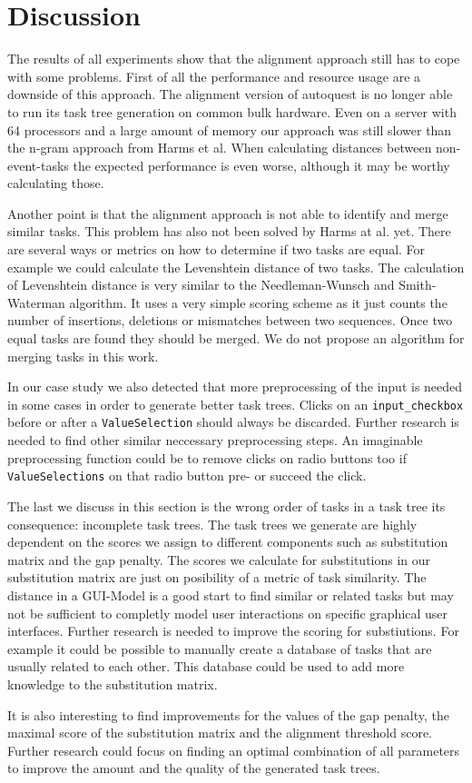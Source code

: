 \section{Discussion}
The results of all experiments show that the alignment approach still has to cope with some problems.
First of all the performance and resource usage are a downside of this approach. 
The alignment version of autoquest is no longer able to run its task tree generation on common bulk hardware. 
Even on a server with 64 processors and a large amount of memory our approach was still slower than the n-gram approach from Harms et al.
When calculating distances between non-event-tasks the expected performance is even worse, although it may be worthy calculating those.

Another point is that the alignment approach is not able to identify and merge similar tasks. 
This problem has also not been solved by Harms at al. yet. 
There are several ways or metrics on how to determine if two tasks are equal.
For example we could calculate the Levenshtein distance of two tasks. 
The calculation of Levenshtein distance is very similar to the Needleman-Wunsch and Smith-Waterman algorithm. 
It uses a very simple scoring scheme as it just counts the number of insertions, deletions or mismatches between two sequences.
Once two equal tasks are found they should be merged. 
We do not propose an algorithm for merging tasks in this work.

In our case study we also detected that more preprocessing of the input is needed in some cases in order to generate better task trees.
Clicks on an \texttt{input\_checkbox} before or after a \texttt{ValueSelection} should always be discarded. 
Further research is needed to find other similar neccessary preprocessing steps. 
An imaginable preprocessing function could be to remove clicks on radio buttons too if \texttt{ValueSelections} on that radio button pre- or succeed the click.

The last we discuss in this section is the wrong order of tasks in a task tree its consequence: incomplete task trees.
The task trees we generate are highly dependent on the scores we assign to different components such as substitution matrix and the gap penalty.
The scores we calculate for substitutions in our substitution matrix are just on posibility of a metric of task similarity. 
The distance in a GUI-Model is a good start to find similar or related tasks but may not be sufficient to completly model user interactions on specific graphical user interfaces.
Further research is needed to improve the scoring for substiutions. 
For example it could be possible to manually create a database of tasks that are usually related to each other.
This database could be used to add more knowledge to the substitution matrix.

It is also interesting to find improvements for the values of the gap penalty, the maximal score of the substitution matrix and the alignment threshold score.
Further research could focus on finding an optimal combination of all parameters to improve the amount and the quality of the generated task trees.



